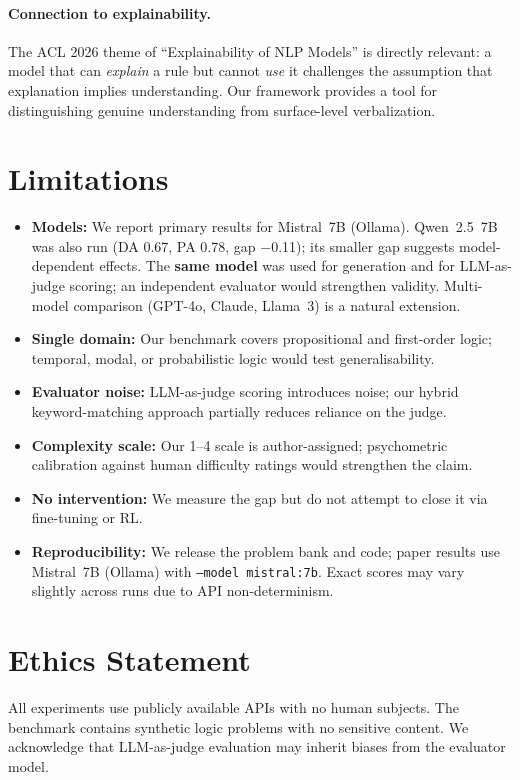 \documentclass[11pt]{article}
\begin{document}
\paragraph{Connection to explainability.}
The ACL 2026 theme of ``Explainability of NLP Models'' is directly
relevant: a model that can \emph{explain} a rule but cannot \emph{use}
it challenges the assumption that explanation implies understanding.
Our framework provides a tool for distinguishing genuine understanding
from surface-level verbalization.

\section{Limitations}
\label{sec:limitations}

\begin{itemize}
    \item \textbf{Models:} We report primary results for Mistral~7B (Ollama). Qwen~2.5~7B was also run (DA 0.67, PA 0.78, gap $-$0.11); its smaller gap suggests model-dependent effects.
    The \textbf{same model} was used for generation and for LLM-as-judge scoring; an independent evaluator would strengthen validity.
    Multi-model comparison (GPT-4o, Claude, Llama~3) is a natural
    extension.
    \item \textbf{Single domain:} Our benchmark covers propositional
    and first-order logic; temporal, modal, or probabilistic logic
    would test generalisability.
    \item \textbf{Evaluator noise:} LLM-as-judge scoring introduces
    noise; our hybrid keyword-matching approach partially reduces reliance on the judge.
    \item \textbf{Complexity scale:} Our 1--4 scale is
    author-assigned; psychometric calibration against human
    difficulty ratings would strengthen the claim.
    \item \textbf{No intervention:} We measure the gap but do not
    attempt to close it via fine-tuning or RL.
    \item \textbf{Reproducibility:} We release the problem bank and
    code; paper results use Mistral~7B (Ollama) with \texttt{--model mistral:7b}. Exact scores may vary slightly across runs due to API non-determinism.
\end{itemize}

\section{Ethics Statement}
All experiments use publicly available APIs with no human subjects.
The benchmark contains synthetic logic problems with no sensitive
content. We acknowledge that LLM-as-judge evaluation may inherit
biases from the evaluator model.
\end{document}
